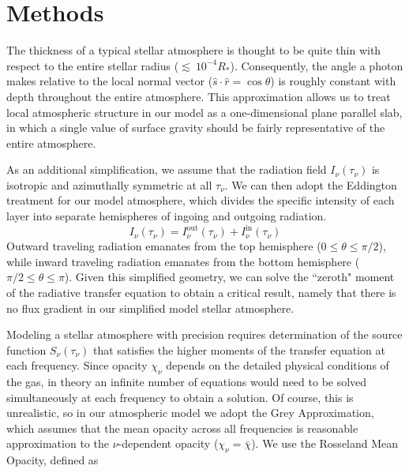 \documentclass[iop,revtex4]{emulateapj}
\newcommand*\mean[1]{\bar{#1}}
\begin{document}
\section{Methods} \label{methods}

The thickness of a typical stellar atmosphere is thought to be quite thin with respect to the entire stellar radius ($\lesssim~10^{-4}R_{*}$). Consequently, the angle a photon makes relative to the local normal vector ($\hat{s} \cdot \hat{r}=\cos\theta$) is roughly constant with depth throughout the entire atmosphere. This approximation allows us to treat local atmospheric structure in our model as a one-dimensional plane parallel slab, in which a single value of surface gravity should be fairly representative of the entire atmosphere.
\par
As an additional simplification, we assume that the radiation field $I_{\nu}(\tau_{\nu})$ is isotropic and azimuthally symmetric at all $\tau_{\nu}$. We can then adopt the Eddington treatment for our model atmosphere, which divides the specific intensity of each layer into separate hemispheres of ingoing and outgoing radiation.
\begin{equation}
I_{\nu}(\tau_{\nu})=I_{\nu}^{\text{out}}(\tau_{\nu})+I_{\nu}^{\text{in}}(\tau_{\nu})
\end{equation}
Outward traveling radiation emanates from the top hemisphere ($0\leq \theta \leq \pi/2$), while inward traveling radiation emanates from the bottom hemisphere ($\pi/2 \leq \theta \leq \pi$). Given this simplified geometry, we can solve the ``zeroth" moment of the radiative transfer equation to obtain a critical result, namely that there is no flux gradient in our simplified model stellar atmosphere. 
\par
Modeling a stellar atmosphere with precision requires determination of the source function $S_{\nu}(\tau_{\nu})$ that satisfies the higher moments of the transfer equation at each frequency. Since opacity $\chi_{\nu}$ depends on the detailed physical conditions of the gas, in theory an infinite number of equations would need to be solved simultaneously at each frequency to obtain a solution. Of course, this is unrealistic, so in our atmospheric model we adopt the Grey Approximation, which assumes that the mean opacity across all frequencies is reasonable approximation to the $\nu$-dependent opacity ($\chi_{\nu}=\mean\chi$). We use the Rosseland Mean Opacity, defined as
\end{document}
